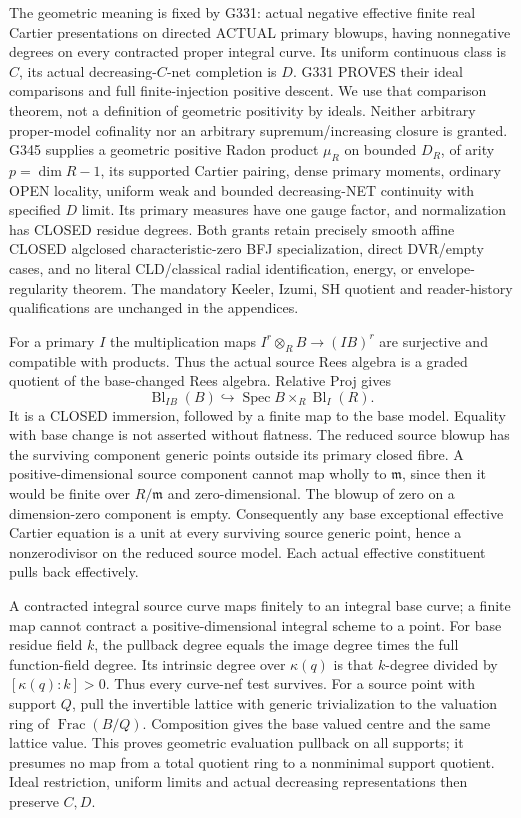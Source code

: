 \documentclass[11pt]{article}
\begin{document}
The geometric meaning is fixed by G331: actual negative effective finite real Cartier presentations on directed ACTUAL primary blowups, having nonnegative degrees on every contracted proper integral curve. Its uniform continuous class is $C$, its actual decreasing-$C$-net completion is $D$. G331 PROVES their ideal comparisons and full finite-injection positive descent. We use that comparison theorem, not a definition of geometric positivity by ideals. Neither arbitrary proper-model cofinality nor an arbitrary supremum/increasing closure is granted. G345 supplies a geometric positive Radon product $\mu_R$ on bounded $D_R$, of arity $p=\dim R-1$, its supported Cartier pairing, dense primary moments, ordinary OPEN locality, uniform weak and bounded decreasing-NET continuity with specified $D$ limit. Its primary measures have one gauge factor, and normalization has CLOSED residue degrees. Both grants retain precisely smooth affine CLOSED algclosed characteristic-zero BFJ specialization, direct DVR/empty cases, and no literal CLD/classical radial identification, energy, or envelope-regularity theorem. The mandatory Keeler, Izumi, SH quotient and reader-history qualifications are unchanged in the appendices.

For a primary $I$ the multiplication maps $I^r\otimes_R B\to(IB)^r$ are surjective and compatible with products. Thus the actual source Rees algebra is a graded quotient of the base-changed Rees algebra. Relative Proj gives
\[
 \operatorname{Bl}_{IB}(B)\hookrightarrow\operatorname{Spec}B\times_R\operatorname{Bl}_I(R).
\]
It is a CLOSED immersion, followed by a finite map to the base model. Equality with base change is not asserted without flatness. The reduced source blowup has the surviving component generic points outside its primary closed fibre. A positive-dimensional source component cannot map wholly to $\mathfrak m$, since then it would be finite over $R/\mathfrak m$ and zero-dimensional. The blowup of zero on a dimension-zero component is empty. Consequently any base exceptional effective Cartier equation is a unit at every surviving source generic point, hence a nonzerodivisor on the reduced source model. Each actual effective constituent pulls back effectively.

A contracted integral source curve maps finitely to an integral base curve; a finite map cannot contract a positive-dimensional integral scheme to a point. For base residue field $k$, the pullback degree equals the image degree times the full function-field degree. Its intrinsic degree over $\kappa(q)$ is that $k$-degree divided by $[\kappa(q):k]>0$. Thus every curve-nef test survives. For a source point with support $Q$, pull the invertible lattice with generic trivialization to the valuation ring of $\operatorname{Frac}(B/Q)$. Composition gives the base valued centre and the same lattice value. This proves geometric evaluation pullback on all supports; it presumes no map from a total quotient ring to a nonminimal support quotient. Ideal restriction, uniform limits and actual decreasing representations then preserve $C,D$.
\end{document}
